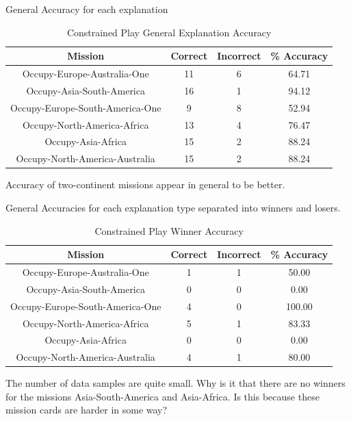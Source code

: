 \documentclass[parskip]{cs4rep}
\begin{document}
General Accuracy for each explanation

\begin{table}[ht]
\centering
\begin{tabular}{|c|c|c|c|}
\hline 
\textbf{Mission} & \textbf{Correct} & \textbf{Incorrect} & \textbf{\% Accuracy} \\ 
\hline 
Occupy-Europe-Australia-One & 11 & 6 & 64.71 \\  
\hline 
Occupy-Asia-South-America & 16 & 1 & 94.12 \\ 
\hline
Occupy-Europe-South-America-One & 9 & 8 & 52.94 \\
\hline
Occupy-North-America-Africa & 13 & 4 & 76.47 \\
\hline
Occupy-Asia-Africa & 15 & 2 & 88.24 \\
\hline
Occupy-North-America-Australia & 15 & 2 & 88.24 \\
\hline
\end{tabular}
\caption{Constrained Play General Explanation Accuracy}
\label{table:continent-bonus}
\end{table}

Accuracy of two-continent missions appear in general to be better.

General Accuracies for each explanation type separated into winners and losers.

\begin{table}[ht]
\centering
\begin{tabular}{|c|c|c|c|}
\hline 
\textbf{Mission} & \textbf{Correct} & \textbf{Incorrect} & \textbf{\% Accuracy} \\ 
\hline 
Occupy-Europe-Australia-One & 1 & 1 & 50.00 \\  
\hline 
Occupy-Asia-South-America & 0 & 0 & 0.00 \\ 
\hline
Occupy-Europe-South-America-One & 4 & 0 & 100.00 \\
\hline
Occupy-North-America-Africa & 5 & 1 & 83.33 \\
\hline
Occupy-Asia-Africa & 0 & 0 & 0.00 \\
\hline
Occupy-North-America-Australia & 4 & 1 & 80.00 \\
\hline
\end{tabular}
\caption{Constrained Play Winner Accuracy}
\label{table:continent-bonus}
\end{table}
		
The number of data samples are quite small.	Why is it that there are no winners for the missions Asia-South-America and Asia-Africa. Is this because these mission cards are harder in some way?
		
\end{document}
